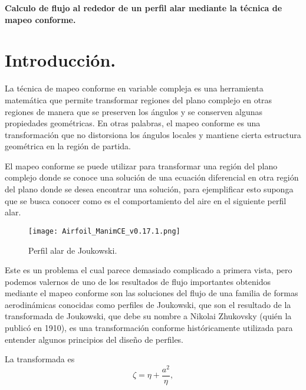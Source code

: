 \documentclass[12pt]{article}
\begin{document}
\newpage
\begin{center}
    \textbf{\Large Calculo de flujo al rededor de un perfil alar mediante la técnica de mapeo conforme.}
    \end{center}

\section*{Introducción.}
	\noindent La técnica de mapeo conforme en variable compleja es una herramienta matemática que permite transformar regiones del plano complejo en otras regiones de manera que se preserven los ángulos y se conserven algunas propiedades geométricas. En otras palabras, el mapeo conforme es una transformación que no distorsiona los ángulos locales y mantiene cierta estructura geométrica en la región de partida.

	El mapeo conforme se puede utilizar para transformar una región del plano complejo donde se conoce una solución de una ecuación diferencial en otra región del plano donde se desea encontrar una solución, para ejemplificar esto suponga que se busca conocer como es el comportamiento del aire en el siguiente perfil alar.

	\begin{figure}[!h]
		\begin{small}
			\begin{center}
				\texttt{[image: Airfoil\_ManimCE\_v0.17.1.png]}
			\end{center}
			\caption{Perfil alar de Joukowski.}
		\end{small}
	\end{figure}
	
	\noindent Este es un problema el cual parece demasiado complicado a primera vista, pero podemos valernos de uno de los resultados de flujo importantes obtenidos mediante el mapeo conforme son las soluciones del flujo de una familia de formas aerodinámicas conocidas como perfiles de Joukowski, que son el resultado de  la transformada de Joukowski, que debe su nombre a Nikolai Zhukovsky (quién la publicó en 1910), es una transformación conforme históricamente utilizada para entender algunos principios del diseño de perfiles.
	
	La transformada es
	\begin{equation}
		\zeta = \eta + \frac{a^2}{\eta},
	\end{equation}
	
\end{document}
